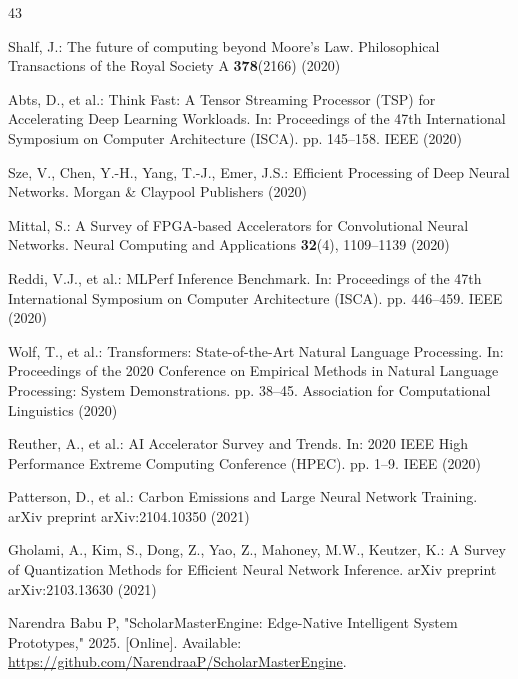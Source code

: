\documentclass[conference]{IEEEtran}
\begin{document}
\begin{thebibliography}{43}

Shalf, J.: The future of computing beyond Moore's Law. Philosophical Transactions of the Royal Society A \textbf{378}(2166) (2020)


Abts, D., et al.: Think Fast: A Tensor Streaming Processor (TSP) for Accelerating Deep Learning Workloads. In: Proceedings of the 47th International Symposium on Computer Architecture (ISCA). pp. 145--158. IEEE (2020)


Sze, V., Chen, Y.-H., Yang, T.-J., Emer, J.S.: Efficient Processing of Deep Neural Networks. Morgan \& Claypool Publishers (2020)


Mittal, S.: A Survey of FPGA-based Accelerators for Convolutional Neural Networks. Neural Computing and Applications \textbf{32}(4), 1109--1139 (2020)


Reddi, V.J., et al.: MLPerf Inference Benchmark. In: Proceedings of the 47th International Symposium on Computer Architecture (ISCA). pp. 446--459. IEEE (2020)


Wolf, T., et al.: Transformers: State-of-the-Art Natural Language Processing. In: Proceedings of the 2020 Conference on Empirical Methods in Natural Language Processing: System Demonstrations. pp. 38--45. Association for Computational Linguistics (2020)


Reuther, A., et al.: AI Accelerator Survey and Trends. In: 2020 IEEE High Performance Extreme Computing Conference (HPEC). pp. 1--9. IEEE (2020)


Patterson, D., et al.: Carbon Emissions and Large Neural Network Training. arXiv preprint arXiv:2104.10350 (2021)


Gholami, A., Kim, S., Dong, Z., Yao, Z., Mahoney, M.W., Keutzer, K.: A Survey of Quantization Methods for Efficient Neural Network Inference. arXiv preprint arXiv:2103.13630 (2021)


Narendra Babu P, "ScholarMasterEngine: Edge-Native Intelligent System Prototypes," 2025. [Online]. Available: \url{https://github.com/NarendraaP/ScholarMasterEngine}.

\end{thebibliography}
\end{document}
